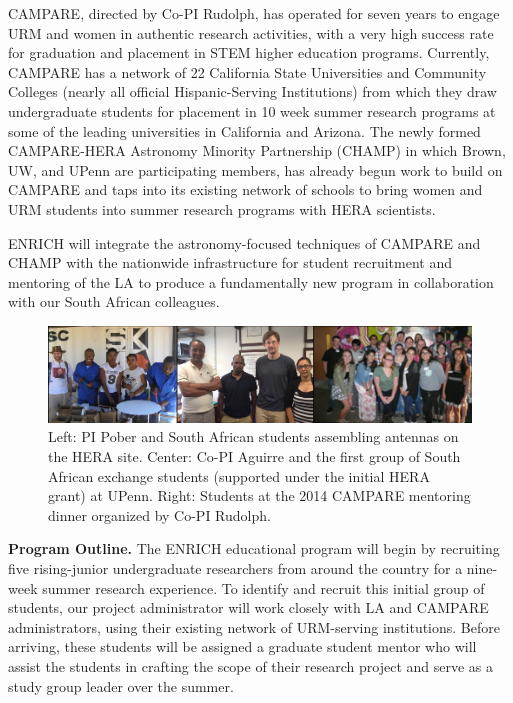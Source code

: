 \documentclass[preprint,11pt]{aastex}
\begin{document}
CAMPARE, directed by Co-PI Rudolph, has operated for seven years to engage URM and women in authentic research activities, with a very high success rate for graduation and placement in STEM higher education programs.  Currently, CAMPARE has a network of 22 California State Universities and Community Colleges (nearly all official Hispanic-Serving Institutions) from which they draw undergraduate students for placement in 10 week summer research programs at some of the leading universities in California and Arizona.  The newly formed CAMPARE-HERA Astronomy Minority Partnership (CHAMP) in which Brown, UW, and UPenn are participating members, has already begun work to build on CAMPARE and taps into its existing network of schools to bring women and URM students into summer research programs with HERA scientists. 

ENRICH will integrate the astronomy-focused techniques of CAMPARE and CHAMP with the nationwide infrastructure for student recruitment and mentoring of the LA to produce a fundamentally new program in collaboration with our South African colleagues.  

\begin{figure}[!ht]
\centering
\includegraphics{education_fig.pdf}
\caption{Left: PI Pober and South African students assembling antennas on the HERA site.  Center: Co-PI Aguirre and the first group of South African exchange students (supported under the initial HERA grant) at UPenn.  Right: Students at the 2014 CAMPARE mentoring dinner organized by Co-PI Rudolph.}
\label{fig:education}
\end{figure}

\textbf{Program Outline.} The ENRICH educational program will begin by recruiting five rising-junior undergraduate researchers from around the country for a nine-week summer research experience.  To identify and recruit this initial group of students, our project administrator will work closely with LA and CAMPARE administrators, using their existing network of URM-serving institutions.  Before arriving, these students will be assigned a graduate student mentor who will assist the students in crafting the scope of their research project and serve as a study group leader over the summer.
\end{document}

